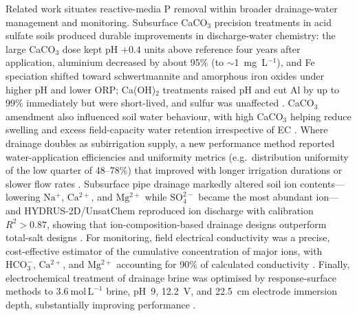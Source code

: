 \documentclass[11pt]{article}
\begin{document}
Related work situates reactive-media P removal within broader drainage-water
management and monitoring. Subsurface CaCO$_3$ precision treatments in acid
sulfate soils produced durable improvements in discharge-water chemistry: the
large CaCO$_3$ dose kept pH $+0.4$ units above reference four years after
application, aluminium decreased by about 95\% (to $\sim$1~mg~L$^{-1}$), and Fe
speciation shifted toward schwertmannite and amorphous iron oxides under higher
pH and lower ORP; Ca(OH)$_2$ treatments raised pH and cut Al by up to 99\%
immediately but were short-lived, and sulfur was unaffected \parencite{Dalhem2019}.
CaCO$_3$ amendment also influenced soil water behaviour, with high CaCO$_3$
helping reduce swelling and excess field-capacity water retention irrespective of
EC \parencite{He2015}. Where drainage doubles as subirrigation supply, a new
performance method reported water-application efficiencies and uniformity metrics
(e.g.\ distribution uniformity of the low quarter of 48--78\%) that improved with
longer irrigation durations or slower flow rates \parencite{Jia2017}. Subsurface
pipe drainage markedly altered soil ion contents---lowering $\mathrm{Na^+}$,
$\mathrm{Ca^{2+}}$, and $\mathrm{Mg^{2+}}$ while $\mathrm{SO_4^{2-}}$ became the
most abundant ion---and HYDRUS-2D/UnsatChem reproduced ion discharge with
calibration $R^2 > 0.87$, showing that ion-composition-based drainage designs
outperform total-salt designs \parencite{Liu2025b}. For monitoring, field
electrical conductivity was a precise, cost-effective estimator of the cumulative
concentration of major ions, with $\mathrm{HCO_3^-}$, $\mathrm{Ca^{2+}}$, and
$\mathrm{Mg^{2+}}$ accounting for 90\% of calculated conductivity
\parencite{Zimmerman2017}. Finally, electrochemical treatment of drainage brine
was optimised by response-surface methods to $3.6~\mathrm{mol\,L^{-1}}$ brine,
pH~9, 12.2~V, and 22.5~cm electrode immersion depth, substantially improving
performance \parencite{Yang2023}.

\printbibliography
\end{document}
